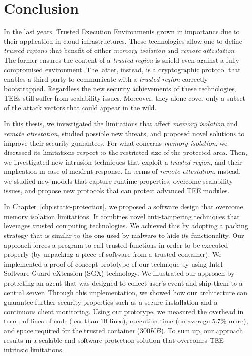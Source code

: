 \chapter{Conclusion}
\label{chp:conclusion}

In the last years, Trusted Execution Environments grown in importance due to 
their application in cloud infrastructures.
These technologies allow one to define \emph{trusted regions} that benefit of 
either \emph{memory isolation} and \emph{remote attestation}.
The former ensures the content of a \emph{trusted region} is shield even 
against a fully compromised environment.
The latter, instead, is a cryptographic protocol that enables a third party to 
communicate with a \emph{trusted region} correctly bootstrapped.
Regardless the new security achievements of these technologies, TEEs still 
suffer from scalability issues. 
Moreover, they alone cover only a subset of the attack vectors that could 
appear in the wild.
		
In this thesis, we investigated the limitations that affect \emph{memory 
isolation} and \emph{remote attestation}, studied possible new threats, and 
proposed novel solutions to improve their security guarantees.
For what concerns \emph{memory isolation}, we discussed its limitations 
respect to the restricted size of the protected area.
Then, we investigated new intrusion techniques that exploit 
a \emph{trusted region}, and their implication in case of incident response.
In terms of \emph{remote attestation}, instead, we studied new models that 
capture runtime properties, overcome scalability issues, and propose new 
protocols that can protect advanced TEE modules.

In Chapter~\ref{chp:static-protection}, we proposed a software design that 
overcome memory isolation limitations. It combines novel anti-tampering 
techniques that leverages trusted computing technologies.
We achieved this by adopting a packing strategy that is similar to the one used 
by malware to hide its functionality.
Our approach forces a program to call trusted functions in order to be executed 
properly (by unpacking a piece of software from a trusted container). 
We implemented a proof-of-concept prototype of our technique by using Intel 
Software Guard eXtension (SGX) technology.
We illustrated our approach by protecting an agent that was designed to collect 
user's event and ship them to a central server.
Through this implementation, we showed how our architecture can guarantee 
further security properties such as a secure installation and a continuous 
client monitoring. Using our prototype, we measured the overhead in terms of 
lines of code (less than $10$ lines), execution time (on average $5.7\%$ more), 
and space required for the trusted container ($300KB$).
To sum up, our approach results in a scalable and software protection solution 
that overcomes TEE intrinsic limitations.

